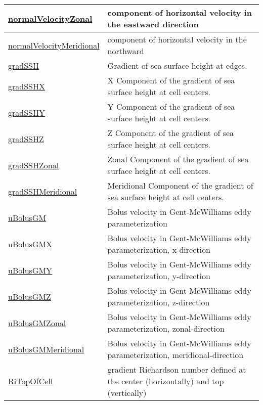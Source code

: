 {\begin{center}
\begin{longtable}{| p{2.0in} | p{4.0in} |}
	\hline
	\hyperref[subsec:var_sec_diagnostics_normalVelocityZonal]{normalVelocityZonal} & component of horizontal velocity in the eastward direction \\
	\hline
	\hyperref[subsec:var_sec_diagnostics_normalVelocityMeridional]{normalVelocityMeridional} & component of horizontal velocity in the northward \\
	\hline
	\hyperref[subsec:var_sec_diagnostics_gradSSH]{gradSSH} & Gradient of sea surface height at edges. \\
	\hline
	\hyperref[subsec:var_sec_diagnostics_gradSSHX]{gradSSHX} & X Component of the gradient of sea surface height at cell centers. \\
	\hline
	\hyperref[subsec:var_sec_diagnostics_gradSSHY]{gradSSHY} & Y Component of the gradient of sea surface height at cell centers. \\
	\hline
	\hyperref[subsec:var_sec_diagnostics_gradSSHZ]{gradSSHZ} & Z Component of the gradient of sea surface height at cell centers. \\
	\hline
	\hyperref[subsec:var_sec_diagnostics_gradSSHZonal]{gradSSHZonal} & Zonal Component of the gradient of sea surface height at cell centers. \\
	\hline
	\hyperref[subsec:var_sec_diagnostics_gradSSHMeridional]{gradSSHMeridional} & Meridional Component of the gradient of sea surface height at cell centers. \\
	\hline
	\hyperref[subsec:var_sec_diagnostics_uBolusGM]{uBolusGM} & Bolus velocity in Gent-McWilliams eddy parameterization \\
	\hline
	\hyperref[subsec:var_sec_diagnostics_uBolusGMX]{uBolusGMX} & Bolus velocity in Gent-McWilliams eddy parameterization, x-direction \\
	\hline
	\hyperref[subsec:var_sec_diagnostics_uBolusGMY]{uBolusGMY} & Bolus velocity in Gent-McWilliams eddy parameterization, y-direction \\
	\hline
	\hyperref[subsec:var_sec_diagnostics_uBolusGMZ]{uBolusGMZ} & Bolus velocity in Gent-McWilliams eddy parameterization, z-direction \\
	\hline
	\hyperref[subsec:var_sec_diagnostics_uBolusGMZonal]{uBolusGMZonal} & Bolus velocity in Gent-McWilliams eddy parameterization, zonal-direction \\
	\hline
	\hyperref[subsec:var_sec_diagnostics_uBolusGMMeridional]{uBolusGMMeridional} & Bolus velocity in Gent-McWilliams eddy parameterization, meridional-direction \\
	\hline
	\hyperref[subsec:var_sec_diagnostics_RiTopOfCell]{RiTopOfCell} & gradient Richardson number defined at the center (horizontally) and top (vertically) \\

\end{longtable}
\end{center}}
